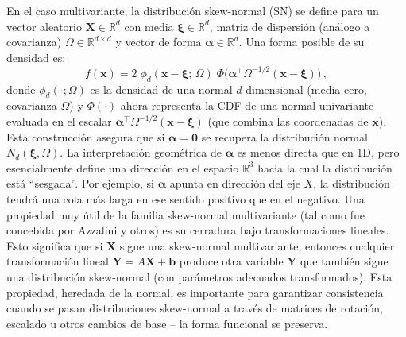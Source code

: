En el caso multivariante, la distribución skew-normal (SN) se define para un vector aleatorio $\mathbf{X}\in \mathbb{R}^d$ con media 
$\boldsymbol{\xi}\in\mathbb{R}^d$, matriz de dispersión (análogo a covarianza) $\Omega \in \mathbb{R}^{d\times d}$ y vector de forma 
$\boldsymbol{\alpha}\in\mathbb{R}^d$. Una forma posible de su densidad es:
$$f(\mathbf{x}) = 2 \;\phi_d(\mathbf{x}-\boldsymbol{\xi};\,\Omega)\;\Phi\!\big(\boldsymbol{\alpha}^\top \Omega^{-1/2}(\mathbf{x}-\boldsymbol{\xi})\big)\,,$$
donde $\phi_d(\cdot;\Omega)$ es la densidad de una normal $d$-dimensional (media cero, covarianza $\Omega$) y $\Phi(\cdot)$ ahora representa 
la CDF de una normal univariante evaluada en el escalar $\boldsymbol{\alpha}^\top \Omega^{-1/2}(\mathbf{x}-\boldsymbol{\xi})$ 
(que combina las coordenadas de $\mathbf{x}$). Esta construcción asegura que si $\boldsymbol{\alpha}=\mathbf{0}$ se recupera la distribución 
normal $N_d(\boldsymbol{\xi},\Omega)$. La interpretación geométrica de $\boldsymbol{\alpha}$ es menos directa que en 1D, pero esencialmente 
define una dirección en el espacio $\mathbb{R}^3$ hacia la cual la distribución está “sesgada”. Por ejemplo, si $\boldsymbol{\alpha}$ apunta 
en dirección del eje $X$, la distribución tendrá una cola más larga en ese sentido positivo que en el negativo. Una propiedad muy útil de la 
familia skew-normal multivariante (tal como fue concebida por Azzalini y otros) es su cerradura bajo transformaciones lineales. 
Esto significa que si $\mathbf{X}$ sigue una skew-normal multivariante, entonces cualquier transformación lineal $\mathbf{Y}=A\mathbf{X}+\mathbf{b}$ 
produce otra variable $\mathbf{Y}$ que también sigue una distribución skew-normal (con parámetros adecuados transformados). Esta propiedad, 
heredada de la normal, es importante para garantizar consistencia cuando se pasan distribuciones skew-normal a través de matrices de rotación, 
escalado u otros cambios de base – la forma funcional se preserva.

